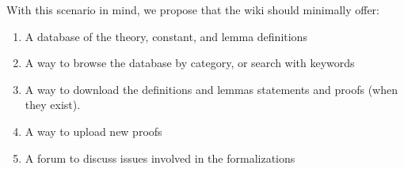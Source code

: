 With this scenario in mind, we propose that the wiki should minimally offer: %

\begin{enumerate}  %
\item A database of the theory, constant, and lemma definitions %
\item A way to browse the database by category, or search with keywords %
\item A way to download the definitions and lemmas statements and proofs (when they exist).   %
\item A way to upload new proofs %
\item A forum to discuss issues involved in the formalizations %
\end{enumerate}  %

